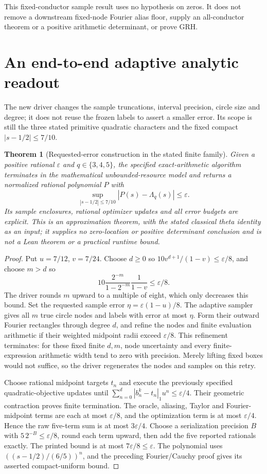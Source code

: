 \documentclass[11pt]{article}
\newtheorem{theorem}{Theorem}[section]
\theoremstyle{definition}\newtheorem{definition}[theorem]{Definition}
\theoremstyle{remark}\newtheorem{remark}[theorem]{Remark}
\begin{document}
This fixed-conductor sample result uses no hypothesis on zeros.
It does not remove a downstream fixed-node Fourier alias floor, supply
an all-conductor theorem or a positive arithmetic determinant, or prove GRH.

\section{An end-to-end adaptive analytic readout}\label{at:family}
The new driver changes the sample truncations, interval precision, circle
size and degree; it does not reuse the frozen labels to assert a smaller
error. Its scope is still the three stated primitive quadratic characters
and the fixed compact $|s-1/2|\le7/10$.

\begin{theorem}[Requested-error construction in the stated finite family]\label{at:requested}
Given a positive rational $\varepsilon$ and $q\in\{3,4,5\}$, the specified
exact-arithmetic algorithm terminates in the mathematical unbounded-resource
model and returns a normalized rational polynomial $P$ with
\[
 \sup_{|s-1/2|\le7/10}|P(s)-\Lambda_q(s)|\le\varepsilon.
\]
Its sample enclosures, rational optimizer updates and all error budgets are
explicit. This is an approximation theorem, with the stated classical theta
identity as an input; it supplies no zero-location or positive determinant
conclusion and is not a Lean theorem or a practical runtime bound.
\end{theorem}
\begin{proof}
Put $u=7/12$, $v=7/24$. Choose $d\ge0$ so
$10v^{d+1}/(1-v)\le\varepsilon/8$, and choose $m>d$ so
\[
 10\frac{2^{-m}}{1-2^{-m}}\frac1{1-v}\le\varepsilon/8.
\]
The driver rounds $m$ upward to a multiple of eight, which only decreases
this bound. Set the requested sample error
$\eta=\varepsilon(1-u)/8$. The adaptive sampler gives all $m$ true circle
nodes and labels with error at most $\eta$. Form their outward Fourier
rectangles through degree $d$, and refine the nodes and finite evaluation
arithmetic if their weighted midpoint radii exceed $\varepsilon/8$.
This refinement terminates: for these fixed finite $d,m$, node uncertainty
and every finite-expression arithmetic width tend to zero with precision.
Merely lifting fixed boxes would not suffice, so the driver regenerates the
nodes and samples on this retry.

Choose rational midpoint targets $t_n$ and execute the previously specified
quadratic-objective updates until
$\sum_{n=0}^d|b_n^k-t_n|_1u^n\le\varepsilon/4$.
Their geometric contraction proves finite termination. The oracle,
aliasing, Taylor and Fourier-midpoint terms are each at most
$\varepsilon/8$, and the optimization term is at most $\varepsilon/4$.
Hence the raw five-term sum is at most $3\varepsilon/4$.
Choose a serialization precision $B$ with $5\,2^{-B}\le\varepsilon/8$,
round each term upward, then add the five reported rationals exactly.
The printed bound is at most $7\varepsilon/8\le\varepsilon$.
The polynomial uses $((s-1/2)/(6/5))^n$, and the preceding Fourier/Cauchy
proof gives its asserted compact-uniform bound.
\end{proof}
\end{document}

